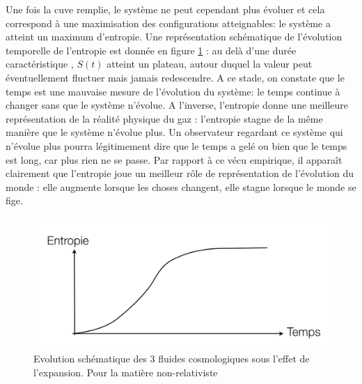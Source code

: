 Une fois la cuve remplie, le système ne peut cependant plus évoluer et cela correspond à une maximisation des configurations atteignables: le système a atteint un maximum d'entropie. Une représentation schématique de l'évolution temporelle de l'entropie est donnée en figure \ref{f:equitemps} : au delà d'une durée caractéristique , $S(t)$ atteint un plateau, autour duquel la valeur peut éventuellement fluctuer mais jamais redescendre. A ce stade, on constate que le temps est une mauvaise mesure de l'évolution du système: le temps continue à changer sans que le système n'évolue. A l'inverse, l'entropie donne une meilleure représentation de la réalité physique du gaz : l'entropie stagne de la même manière que le système n'évolue plus. Un observateur regardant ce système qui n'évolue plus pourra légitimement dire que le temps a gelé ou bien que le temps est long, car plus rien ne se passe. Par rapport à ce vécu empirique, il apparaît clairement que l'entropie joue un meilleur rôle de représentation de l'évolution du monde : elle augmente lorsque les choses changent, elle stagne lorsque le monde se fige. 
\begin{figure}[htbp]
	\centering
		\includegraphics[height=5cm]{figs/equientro.png}
	\caption{Evolution schématique des 3 fluides cosmologiques sous l'effet de l'expansion. Pour la matière non-relativiste}
	\label{f:equitemps}
\end{figure}

